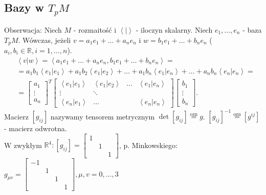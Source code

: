 \documentclass[../main.tex]{subfiles}
\begin{document}
\subsection{Bazy w $T_pM$ }
Obserwacja: Niech $M$ - rozmaitość i $\left< | \right>$ - iloczyn skalarny. Niech $e_1,\ldots,e_n$ - baza $T_pM$. Wówczas, jeżeli $v = a_1e_1+\ldots+a_ne_n$ i $w = b_1e_1+\ldots+b_ne_n$ ($a_i,b_i\in \mathbb{R}, i= 1,\ldots,n$).
\begin{align*}
    &\left<v|w \right> = \left<a_1e_1+\ldots+a_ne_n, b_1e_1+\ldots+b_ne_n \right> = \\
    &= a_1b_1\left<e_1|e_1 \right> + a_1b_2\left<e_1|e_2 \right>+ \ldots + a_1b_n \left<e_1|e_n \right> + \ldots + a_nb_n\left<e_n|e_n \right> = \\
    & = \begin{bmatrix} a_1\\ \vdots \\ a_n\end{bmatrix}^T \begin{bmatrix} \left<e_1|e_1 \right> & \left<e_1|e_2 \right>&\ldots&\left<e_1|e_n \right>\\ \vdots & \ddots & \\ \left<e_n|e_1 \right> & \ldots & & \left<e_n|e_n \right> \end{bmatrix} \begin{bmatrix} b_1 \\ \vdots \\ b_n \end{bmatrix}
.\end{align*}
Macierz $\left[ g_{ij} \right] $ nazywamy tensorem metrycznym $\det \left[ g_{ij} \right] \overset{\text{ozn}}{=} g$. $\left[ g_{ij} \right] ^{-1} \overset{\text{ozn}}{=} \left[ g^{ij} \right] $ - macierz odwrotna.\\
W zwykłym $\mathbb{R}^4: \left[ g_{ij} \right] = \begin{bmatrix} 1&&\\ &1&\\ &&1 \end{bmatrix} $, p. Minkowskiego: $g_{\mu v} = \begin{bmatrix} -1&&&\\ &1&& \\ &&1& \\ &&&1 \end{bmatrix}, \mu,v = 0,\ldots,3 $
\end{document}
